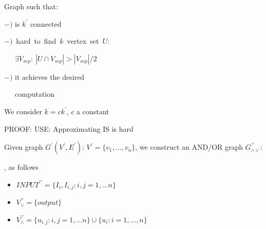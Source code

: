 \documentclass[portrait]{seminar}
\newtheorem{thm}{Theorem}[section]
\begin{document}
\vskip 10pt


\vskip -5.2cm
{\small
\hskip 3.5cm Graph such that:

\hskip 3cm $-)$ is $k^\prime$ connected

\hskip 3cm \mbox{$-)$ hard to find $k$ vertex set $U$:}

\hskip 3cm \ \ \ $\exists V_{sep}:\ |U\cap  V_{sep}|>| V_{sep}|/2$

\hskip 3cm $-)$ it achieves the desired 

\hskip 3cm  \ \ \ computation
}

\vskip 3cm
We consider $k=ck^\prime$, $c$ a constant

\newpage
{}


\noindent
PROOF: USE: Approximating IS is hard 

\noindent
Given graph $G^\prime(V^\prime, E^\prime)$: $V^\prime=\{v_1, \ldots, v_n\}$,
we construct an AND/OR graph $G^{\prime\prime}_{\wedge\vee}$:

\vskip 10pt
, as follows

\vskip 20pt

\begin{itemize}
\item $INPUT^{\prime\prime}=\{I_i,I_{i,j}: i,j=1, \ldots n\}$
\item $V_\vee^{\prime\prime}=\{output\}$
\item $V_\wedge^{\prime\prime}= 
\{u_{i,j}:  i,j=1, \ldots n\} \cup 
\{u_i: i=1, \ldots,n\}$
\end{itemize}
\end{document}
